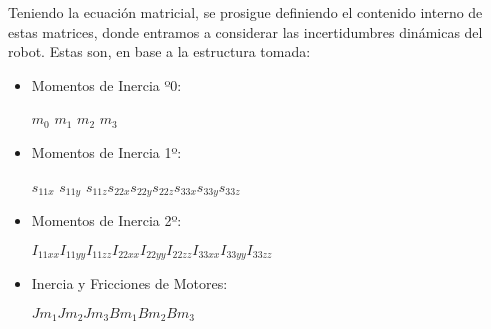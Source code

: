 Teniendo la ecuación matricial, se prosigue definiendo el contenido interno de estas matrices, donde entramos a considerar las incertidumbres dinámicas del robot. Estas son, en base a la estructura tomada:
\vspace{0.3cm}

\begin{itemize}
	\item Momentos de Inercia º0:
		\begin{center}
		$ m_0$ \hspace{0.2cm} $m_1$\hspace{0.2cm} $m_2$ \hspace{0.2cm}$m_3$
		\end{center}
	\item Momentos de Inercia 1º:
		\begin{center}
		$ s_{11x}$\hspace{0.2cm} $s_{11y}$\hspace{0.2cm} $s_{11z}$\hspace{0.2cm}$ s_{22x}$\hspace{0.2cm}$ s_{22y}$\hspace{0.2cm}$ s_{22z}$\hspace{0.2cm}$ s_{33x}$\hspace{0.2cm}$ s_{33y}$\hspace{0.2cm}$ s_{33z} $
	\end{center}
	\item Momentos de Inercia 2º:
		\begin{center}
		$ I_{11xx} $\hspace{0.2cm}$I_{11yy}$\hspace{0.2cm}$ I_{11zz}$\hspace{0.2cm}$ I_{22xx}$\hspace{0.2cm}$ I_{22yy}$\hspace{0.2cm}$ I_{22zz}$\hspace{0.2cm}$ I_{33xx}$\hspace{0.2cm}$ I_{33yy}$\hspace{0.2cm}$ I_{33zz} $
	\end{center}
	\item Inercia y Fricciones de Motores:
	\begin{center}
		$Jm_1$\hspace{0.2cm}$ Jm_2 $\hspace{0.2cm}$Jm_3$\hspace{0.2cm}$ Bm_1$\hspace{0.2cm}$ Bm_2$\hspace{0.2cm}$ Bm_3$
	\end{center}
\end{itemize}

